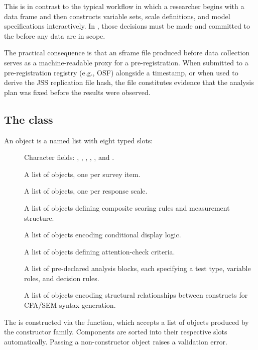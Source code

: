 \documentclass[article]{jss}\usepackage[]{graphicx}\usepackage[]{xcolor}
\begin{document}
This is in contrast to the typical  workflow in which a
researcher begins with a data frame and then constructs variable sets,
scale definitions, and model specifications interactively. In
, those decisions must be made and committed to the
 before any data are in scope.

The practical consequence is that an sframe file produced before data
collection serves as a machine-readable proxy for a pre-registration.
When submitted to a pre-registration registry (e.g., OSF) alongside a
timestamp, or when used to derive the JSS replication file hash, the
 file constitutes evidence that the analysis plan was
fixed before the results were observed.

\subsection[The sframe class]{The  class}

An  object is a named list with eight typed slots:

\begin{description}
  \item[] Character fields: , ,
    , , , and
    .
  \item[] A list of  objects, one per survey
    item.
  \item[] A list of  objects, one per
    response scale.
  \item[] A list of  objects defining
    composite scoring rules and measurement structure.
  \item[] A list of  objects encoding
    conditional display logic.
  \item[] A list of  objects defining
    attention-check criteria.
  \item[] A list of pre-declared analysis blocks,
    each specifying a test type, variable roles, and decision rules.
  \item[] A list of  objects encoding
    structural relationships between constructs for CFA/SEM syntax
    generation.
\end{description}

The  is constructed via the 
function, which accepts a  list of objects produced
by the  constructor family. Components are sorted into their
respective slots automatically. Passing a non-constructor object raises
a validation error.
\end{document}
